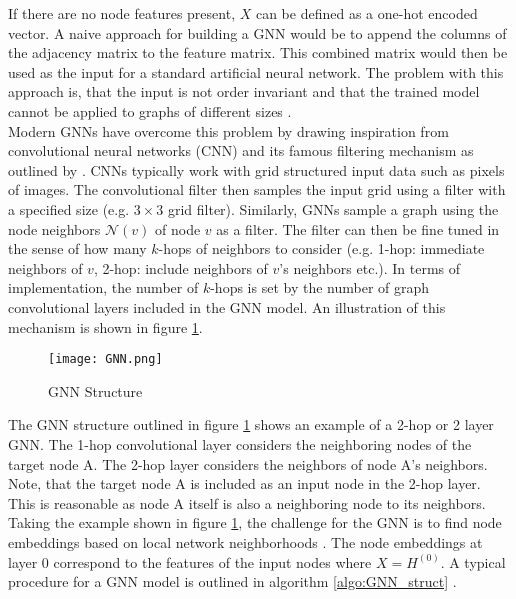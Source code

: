 	\noindent If there are no node features present, $X$ can be defined as a 
	one-hot encoded vector. A naive approach for building a GNN would be to
	append the columns of the adjacency matrix to the feature matrix. This
	combined matrix would then be used as the input for a standard
	artificial neural network. The problem with this approach is, that the 
	input is not order invariant and that the trained model cannot be applied 
	to graphs of different sizes \citep{leskovec2021lecture}. \\

	\noindent Modern GNNs have overcome this problem by drawing inspiration from 
	convolutional neural networks (CNN) and its famous filtering mechanism as 
	outlined by \cite{krizhevsky2012imagenet}. CNNs typically work with grid 
	structured input data such as pixels of images. The convolutional filter 
	then samples the input grid using a filter with a specified size 
	(e.g. $3\times3$ grid filter). Similarly, GNNs sample a graph using the node 
	neighbors $\mathcal{N}(v)$ of node $v$ as a filter. The filter can then be 
	fine tuned in the sense of how many $k$-hops of neighbors to consider 
	(e.g. 1-hop: immediate neighbors of $v$, 2-hop: include neighbors of $v$'s 
	neighbors etc.). In terms of implementation, the number of $k$-hops is set 
	by the number of graph convolutional layers included in the GNN model. An 
	illustration of this mechanism is shown in figure \ref{fig:GNN_structure}. \\

	\begin{figure}[h]
		\centering
		\texttt{[image: GNN.png]}
		\caption{GNN Structure}
		\cite{leskovec2021lecture}
		\label{fig:GNN_structure}
	\end{figure}

	\noindent The GNN structure outlined in figure \ref{fig:GNN_structure} 
	shows an example of a 2-hop or 2 layer GNN. The 1-hop convolutional layer 
	considers the neighboring nodes of the target node A. The 2-hop layer 
	considers the neighbors of node A's neighbors. Note, that the target node A 
	is included as an input node in the 2-hop layer. This is reasonable as node 
	A itself is also a neighboring node to its neighbors. Taking the example 
	shown in figure \ref{fig:GNN_structure}, the challenge for the GNN is to 
	find node embeddings based on local network neighborhoods \citep{leskovec2021lecture}. 
	The node embeddings at layer 0 correspond to the features of the input nodes 
	where $X = H^{(0)}$. A typical procedure for a GNN model is outlined in 
	algorithm \ref{algo:GNN_struct} 
	\citep{hamilton2017inductive,leskovec2021lecture,you2020design}.	

